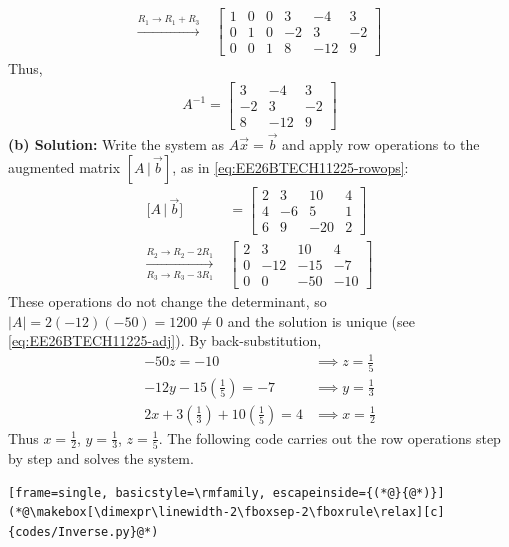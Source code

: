 \begin{enumerate}[label=\thesubsection.\arabic*, ref=\thesubsection.\theenumi]
\begin{align}
    \xrightarrow{R_1\to R_1+R_3}\; &\left[\begin{array}{ccc|ccc} 1 & 0 & 0 & 3 & -4 & 3 \\ 0 & 1 & 0 & -2 & 3 & -2 \\ 0 & 0 & 1 & 8 & -12 & 9 \end{array}\right]
\end{align}
Thus,
\begin{align}
    A^{-1} = \begin{bmatrix} 3 & -4 & 3 \\ -2 & 3 & -2 \\ 8 & -12 & 9 \end{bmatrix}
\end{align}
\textbf{(b) Solution:} Write the system as $A\vec{x}=\vec{b}$ and apply row operations to the augmented matrix $[A\,|\,\vec{b}]$, as in \eqref{eq:EE26BTECH11225-rowops}:
\begin{align}
    \big[A\,|\,\vec{b}\big] &= \left[\begin{array}{ccc|c} 2 & 3 & 10 & 4 \\ 4 & -6 & 5 & 1 \\ 6 & 9 & -20 & 2 \end{array}\right] \\
    \xrightarrow[R_3\to R_3-3R_1]{R_2\to R_2-2R_1}\; &\left[\begin{array}{ccc|c} 2 & 3 & 10 & 4 \\ 0 & -12 & -15 & -7 \\ 0 & 0 & -50 & -10 \end{array}\right]
\end{align}
These operations do not change the determinant, so $|A| = 2(-12)(-50) = 1200 \neq 0$ and the solution is unique (see \eqref{eq:EE26BTECH11225-adj}). By back-substitution,
\begin{align}
    -50z = -10 &\implies z = \frac{1}{5} \\
    -12y - 15\left(\frac{1}{5}\right) = -7 &\implies y = \frac{1}{3} \\
    2x + 3\left(\frac{1}{3}\right) + 10\left(\frac{1}{5}\right) = 4 &\implies x = \frac{1}{2}
\end{align}
Thus $x = \frac{1}{2}$, $y = \frac{1}{3}$, $z = \frac{1}{5}$. The following code carries out the row operations step by step and solves the system.
\begin{lstlisting}[frame=single, basicstyle=\rmfamily, escapeinside={(*@}{@*)}]
(*@\makebox[\dimexpr\linewidth-2\fboxsep-2\fboxrule\relax][c]{codes/Inverse.py}@*)
\end{lstlisting}


\end{enumerate}

